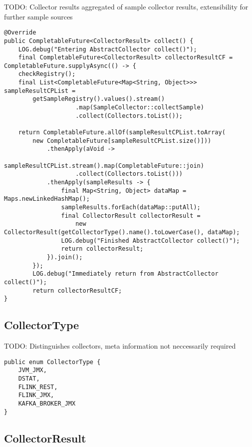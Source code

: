 TODO: Collector results aggregated of sample collector results, extensibility for further sample sources

\begin{lstlisting}[caption={The "collect"-algorithm in "AbstractCollector"}, captionpos=b, label={lst:abstractcollectorcollect}]
@Override
public CompletableFuture<CollectorResult> collect() {
    LOG.debug("Entering AbstractCollector collect()");
    final CompletableFuture<CollectorResult> collectorResultCF = CompletableFuture.supplyAsync(() -> {
    checkRegistry();
    final List<CompletableFuture<Map<String, Object>>> sampleResultCPList =
        getSampleRegistry().values().stream()
                    .map(SampleCollector::collectSample)
                    .collect(Collectors.toList());

    return CompletableFuture.allOf(sampleResultCPList.toArray(
        new CompletableFuture[sampleResultCPList.size()]))
            .thenApply(aVoid ->
                sampleResultCPList.stream().map(CompletableFuture::join)
                    .collect(Collectors.toList()))
            .thenApply(sampleResults -> {
                final Map<String, Object> dataMap = Maps.newLinkedHashMap();
                sampleResults.forEach(dataMap::putAll);
                final CollectorResult collectorResult =
                    new CollectorResult(getCollectorType().name().toLowerCase(), dataMap);
                LOG.debug("Finished AbstractCollector collect()");
                return collectorResult;
            }).join();
        });
        LOG.debug("Immediately return from AbstractCollector collect()");
        return collectorResultCF;
}
\end{lstlisting}

\subsection{CollectorType}

TODO: Distinguishes collectors, meta information not neccessarily required

\begin{lstlisting}[caption={Collector types}, captionpos=b, label={lst:collectortypesimpl}]
public enum CollectorType {
    JVM_JMX,
    DSTAT,
    FLINK_REST,
    FLINK_JMX,
    KAFKA_BROKER_JMX
}
\end{lstlisting}

\subsection{CollectorResult}

